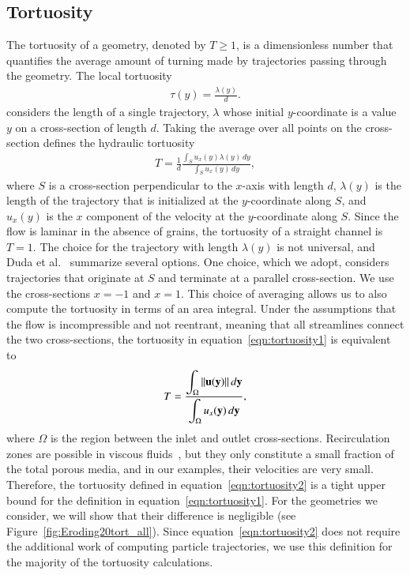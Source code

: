 \documentclass[preprint, 10pt]{elsarticle}
\begin{document}
\subsection{Tortuosity}
The tortuosity of a geometry, denoted by $T \geq 1$, is a dimensionless
number that quantifies the average amount of turning made by
trajectories passing through the geometry.  The local tortuosity
\begin{align}
  \tau(y) = \frac{\lambda(y)}{d}.
  \label{eqn:localTort}
\end{align}
considers the length of a single trajectory, $\lambda$ whose initial
$y$-coordinate is a value $y$ on a cross-section of length $d$.  Taking
the average over all points on the cross-section defines the hydraulic
tortuosity
\begin{align}
  T = \frac{1}{d}\frac{\displaystyle\int_{S}u_x(y)\lambda(y)\,dy}
  {\displaystyle\int_{S}u_x(y)\,dy},
  \label{eqn:tortuosity1}
\end{align}
where $S$ is a cross-section perpendicular to the $x$-axis with length
$d$, $\lambda(y)$ is the length of the trajectory that is initialized at
the $y$-coordinate along $S$, and $u_x(y)$ is the $x$ component of the
velocity at the $y$-coordinate along $S$.  Since the flow is laminar in
the absence of grains, the tortuosity of a straight channel is $T=1$.
The choice for the trajectory with length $\lambda(y)$ is not universal,
and Duda et al.~\cite{dud-koz-mat2011} summarize several options. One
choice, which we adopt, considers trajectories that originate at $S$ and
terminate at a parallel cross-section.  We use the cross-sections $x=-1$
and $x=1$.  This choice of averaging allows us to also compute the
tortuosity in terms of an area integral.  Under the assumptions that the
flow is incompressible and not reentrant, meaning that all streamlines
connect the two cross-sections, the tortuosity in
equation~\eqref{eqn:tortuosity1} is equivalent to~\cite{dud-koz-mat2011}
\begin{align}
  T = \frac{\displaystyle\int_\Omega \|{\mathbf{u}}({\mathbf{y}})\|\, d{\mathbf{y}}}
           {\displaystyle\int_\Omega u_x({\mathbf{y}})\, d{\mathbf{y}}},
  \label{eqn:tortuosity2}
\end{align}
where $\Omega$ is the region between the inlet and outlet
cross-sections.  Recirculation zones are possible in viscous
fluids~\cite{hig1985}, but they only constitute a small fraction of the
total porous media, and in our examples, their velocities are very
small.  Therefore, the tortuosity defined in
equation~\eqref{eqn:tortuosity2} is a tight upper bound for the
definition in equation~\eqref{eqn:tortuosity1}.  For the geometries we
consider, we will show that their difference is negligible (see
Figure~\ref{fig:Eroding20tort_all}).  Since
equation~\eqref{eqn:tortuosity2} does not require the additional work of
computing particle trajectories, we use this definition for the majority
of the tortuosity calculations.
\end{document}
